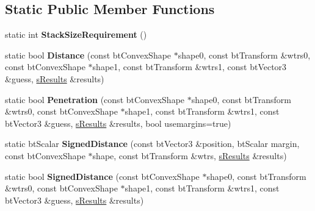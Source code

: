 \subsection*{Static Public Member Functions}
\begin{DoxyCompactItemize}
\item 
\hypertarget{structbt_gjk_epa_solver2_aa6d1e7ce16abccf3bbb6b8cd2468e61b}{static int {\bfseries Stack\+Size\+Requirement} ()}\label{structbt_gjk_epa_solver2_aa6d1e7ce16abccf3bbb6b8cd2468e61b}

\item 
\hypertarget{structbt_gjk_epa_solver2_a687580e208340d8d92baa7a108833a5d}{static bool {\bfseries Distance} (const bt\+Convex\+Shape $\ast$shape0, const bt\+Transform \&wtrs0, const bt\+Convex\+Shape $\ast$shape1, const bt\+Transform \&wtrs1, const bt\+Vector3 \&guess, \hyperlink{structbt_gjk_epa_solver2_1_1s_results}{s\+Results} \&results)}\label{structbt_gjk_epa_solver2_a687580e208340d8d92baa7a108833a5d}

\item 
\hypertarget{structbt_gjk_epa_solver2_a6813bb52592ff84e2fea43285719ba55}{static bool {\bfseries Penetration} (const bt\+Convex\+Shape $\ast$shape0, const bt\+Transform \&wtrs0, const bt\+Convex\+Shape $\ast$shape1, const bt\+Transform \&wtrs1, const bt\+Vector3 \&guess, \hyperlink{structbt_gjk_epa_solver2_1_1s_results}{s\+Results} \&results, bool usemargins=true)}\label{structbt_gjk_epa_solver2_a6813bb52592ff84e2fea43285719ba55}

\item 
\hypertarget{structbt_gjk_epa_solver2_a01766fb4fe5a5e846228c07c5c947ab3}{static bt\+Scalar {\bfseries Signed\+Distance} (const bt\+Vector3 \&position, bt\+Scalar margin, const bt\+Convex\+Shape $\ast$shape, const bt\+Transform \&wtrs, \hyperlink{structbt_gjk_epa_solver2_1_1s_results}{s\+Results} \&results)}\label{structbt_gjk_epa_solver2_a01766fb4fe5a5e846228c07c5c947ab3}

\item 
\hypertarget{structbt_gjk_epa_solver2_ae14d4dcf29d472f8fd47d4e5a74f7e00}{static bool {\bfseries Signed\+Distance} (const bt\+Convex\+Shape $\ast$shape0, const bt\+Transform \&wtrs0, const bt\+Convex\+Shape $\ast$shape1, const bt\+Transform \&wtrs1, const bt\+Vector3 \&guess, \hyperlink{structbt_gjk_epa_solver2_1_1s_results}{s\+Results} \&results)}\label{structbt_gjk_epa_solver2_ae14d4dcf29d472f8fd47d4e5a74f7e00}

\end{DoxyCompactItemize}


